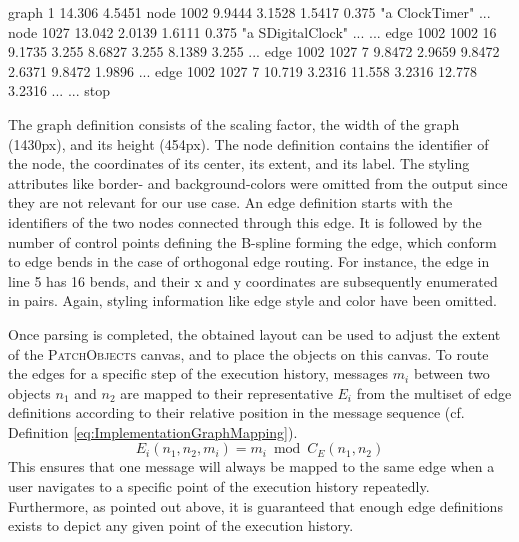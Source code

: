 \begin{graphviz}[caption={Output in plain-ext format as produced by \textsc{Graphviz} for the input from Listing \ref{lst:ImplementationGraphDot}}, label=lst:ImplementationGraphPlainExt]
graph 1 14.306 4.5451
node 1002 9.9444 3.1528 1.5417 0.375 "a ClockTimer" ...
node 1027 13.042 2.0139 1.6111 0.375 "a SDigitalClock" ...
...
edge 1002 1002 16 9.1735 3.255 8.6827 3.255 8.1389 3.255 ...
edge 1002 1027 7 9.8472 2.9659 9.8472 2.6371 9.8472 1.9896 ...
edge 1002 1027 7 10.719 3.2316 11.558 3.2316 12.778 3.2316 ...
...
stop
\end{graphviz}

The graph definition consists of the scaling factor, the width of the graph (1430px), and its height (454px).
The node definition contains the identifier of the node, the coordinates of its center, its extent, and its label.
The styling attributes like border- and background-colors were omitted from the output since they are not relevant for our use case.
An edge definition starts with the identifiers of the two nodes connected through this edge.
It is followed by the number of control points defining the B-spline forming the edge, which conform to edge bends in the case of orthogonal edge routing.
For instance, the edge in line 5 has 16 bends, and their x and y coordinates are subsequently enumerated in pairs.
Again, styling information like edge style and color have been omitted.

Once parsing is completed, the obtained layout can be used to adjust the extent of the \textsc{PatchObjects} canvas, and to place the objects on this canvas.
To route the edges for a specific step of the execution history, messages $m_i$ between two objects $n_1$ and $n_2$ are mapped to their representative $E_i$ from the multiset of edge definitions according to their relative position in the message sequence (cf. Definition \ref{eq:ImplementationGraphMapping}).
\begin{equation}
E_i(n_1, n_2, m_i) = m_i \bmod C_E(n_1, n_2)
\label{eq:ImplementationGraphMapping}
\end{equation}
This ensures that one message will always be mapped to the same edge when a user navigates to a specific point of the execution history repeatedly.
Furthermore, as pointed out above, it is guaranteed that enough edge definitions exists to depict any given point of the execution history.